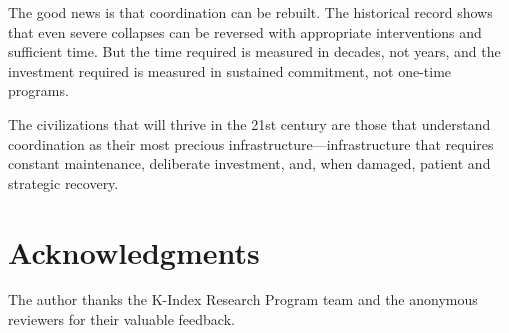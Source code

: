 \documentclass[11pt,letterpaper]{article}
\begin{document}
The good news is that coordination can be rebuilt. The historical record shows that even severe collapses can be reversed with appropriate interventions and sufficient time. But the time required is measured in decades, not years, and the investment required is measured in sustained commitment, not one-time programs.

The civilizations that will thrive in the 21st century are those that understand coordination as their most precious infrastructure---infrastructure that requires constant maintenance, deliberate investment, and, when damaged, patient and strategic recovery.

\section*{Acknowledgments}

The author thanks the K-Index Research Program team and the anonymous reviewers for their valuable feedback.



\end{document}

